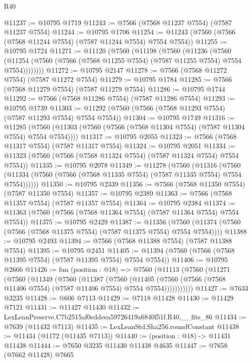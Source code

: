 \begin{lexlean}{R40}
\begin{coremodule}
@11237 := @10795 @1719
@11243 := @7566 (@7568 @11237 @7554) (@7587 @11237 @7554)
@11244 := @10795 @1706
@11254 := @11243 (@7560 (@7566 (@7568 @11244 @7554) (@7587 @11244 @7554) @7554 @7554))
@11255 := @10795 @1724
@11271 := @11120
    (@7560
      (@11198
        (@7560
          (@11236
            (@7560
              (@11254 (@7560 (@7566 (@7568 @11255 @7554) (@7587 @11255 @7554) @7554 @7554))))))))
@11272 := @10795 @2147
@11278 := @7566 (@7568 @11272 @7554) (@7587 @11272 @7554)
@11279 := @10795 @1784
@11285 := @7566 (@7568 @11279 @7554) (@7587 @11279 @7554)
@11286 := @10795 @1744
@11292 := @7566 (@7568 @11286 @7554) (@7587 @11286 @7554)
@11293 := @10795 @1739
@11303 := @11292 (@7560 (@7566 (@7568 @11293 @7554) (@7587 @11293 @7554) @7554 @7554))
@11304 := @10795 @1749
@11316 := @11285
    (@7560 (@11303 (@7560 (@7566 (@7568 @11304 @7554) (@7587 @11304 @7554) @7554 @7554))))
@11317 := @10795 @2055
@11323 := @7566 (@7568 @11317 @7554) (@7587 @11317 @7554)
@11324 := @10795 @2051
@11334 := @11323 (@7560 (@7566 (@7568 @11324 @7554) (@7587 @11324 @7554) @7554 @7554))
@11335 := @10795 @2078
@11349 := @11278
    (@7560
      (@11316
        (@7560 (@11334 (@7560 (@7566 (@7568 @11335 @7554) (@7587 @11335 @7554) @7554 @7554))))))
@11350 := @10795 @2339
@11356 := @7566 (@7568 @11350 @7554) (@7587 @11350 @7554)
@11357 := @10795 @2389
@11363 := @7566 (@7568 @11357 @7554) (@7587 @11357 @7554)
@11364 := @10795 @2384
@11374 := @11363 (@7560 (@7566 (@7568 @11364 @7554) (@7587 @11364 @7554) @7554 @7554))
@11375 := @10795 @2429
@11387 := @11356
    (@7560 (@11374 (@7560 (@7566 (@7568 @11375 @7554) (@7587 @11375 @7554) @7554 @7554))))
@11388 := @10795 @2493
@11394 := @7566 (@7568 @11388 @7554) (@7587 @11388 @7554)
@11395 := @10795 @2451
@11405 := @11394 (@7560 (@7566 (@7568 @11395 @7554) (@7587 @11395 @7554) @7554 @7554))
@11406 := @10795 @2666
@11426 := fun (position : @18) =>
  @7560
    (@11113
      (@7560
        (@11271
          (@7560
            (@11349
              (@7560
                (@11387
                  (@7560
                    (@11405
                      (@7560 (@7566 (@7568 @11406 @7554) (@7587 @11406 @7554) @7554 @7554)))))))))))
@11427 := @7633 @3235
@11428 := @606 @7113
@11429 := @7118 @11428
@11430 := @11429 @7121
@11431 := @11427 @11430
@11432 := LexLeanPreserve.C7b2515af0eddeea59726419a6840f51f.R40.__fits_86
@11434 := @7639 (@11432 @7113)
@11435 := LexLeanStd.Sha256.roundConstant
@11438 := @11434 (@1172 (@11435 @7113))
@11440 := (position : @18) -> @11431 @11438
@11444 := @7650 @3235 @11430 @11438 @4635
@11447 := @7658 (@7662 @11428) @7665

\end{coremodule}
\end{lexlean}
